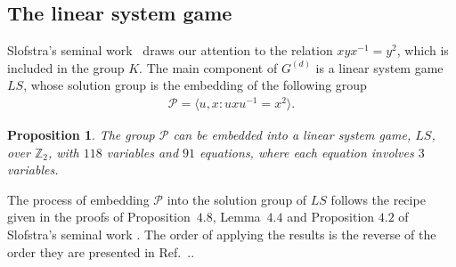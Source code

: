 \documentclass[11pt,letterpaper]{article}
\newcommand{\Z}{\mathbb{Z}}
\newcommand{\1}{\mathbb{1}}
\newcommand{\Pg}{\mathcal{P}}
\newcommand{\G}[1]{G^{(#1)}}
\newcommand{\LS}{LS}
\newtheorem{proposition}[theorem]{Proposition}
\theoremstyle{definition}
\begin{document}
\subsection{The linear system game}
Slofstra's seminal work~\cite{slofstra2017} draws our attention to the relation $xyx^{-1} = y^2$, which
is included in the group $K$.
The main component of $\G{d}$ is a linear system game $\LS$, whose solution group is the embedding of the 
following group
\begin{align}
	\Pg= \langle u, x : uxu^{-1} = x^2 \rangle.
\end{align}

\begin{proposition}
	\label{prop:embed}
	The group $\Pg$ can be embedded into a linear system game, $\LS$, over $\Z_2$,
	with $118$ variables and $91$ equations, where each equation involves $3$ variables.
\end{proposition}
The process of embedding $\Pg$
into the solution group of $\LS$ follows the recipe given in the proofs of
Proposition~$4.8$, Lemma~$4.4$ and Proposition $4.2$ of Slofstra's seminal work \cite{slofstra2017}.
The order of applying the results is the reverse of the order they are presented in Ref.~\cite{slofstra2017}..
\end{document}
